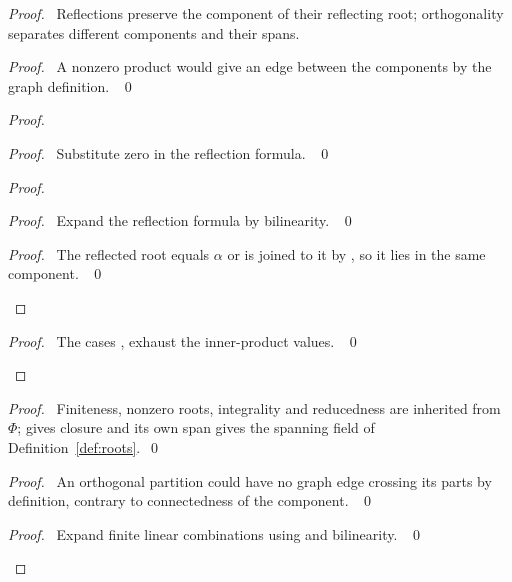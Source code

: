 \begin{proof}
\pfsketch\ Reflections preserve the component of their reflecting root;
orthogonality separates different components and their spans.
\begin{proof}\pf\ A nonzero product would give an edge between the
components by the graph definition. ~\qed\end{proof}
\begin{proof}
\begin{proof}\pf\ Substitute zero in the reflection formula. ~\qed\end{proof}
\begin{proof}
\begin{proof}\pf\ Expand the reflection formula by bilinearity. ~\qed\end{proof}
\qedstep
\begin{proof}\pf\ The reflected root equals $\alpha$ or is joined to it
by , so it lies in the same component. ~\qed\end{proof}
\end{proof}
\qedstep
\begin{proof}\pf\ The cases ,  exhaust
the inner-product values. ~\qed\end{proof}
\end{proof}
\begin{proof}\pf\ Finiteness, nonzero roots, integrality and reducedness
are inherited from $\Phi$;  gives closure and its
own span gives the spanning field of Definition~\ref{def:roots}.~\qed\end{proof}
\begin{proof}\pf\ An orthogonal partition could have no graph edge
crossing its parts by definition, contrary to connectedness of the component. ~\qed\end{proof}
\begin{proof}\pf\ Expand finite linear combinations using
 and bilinearity. ~\qed\end{proof}

\end{proof}
